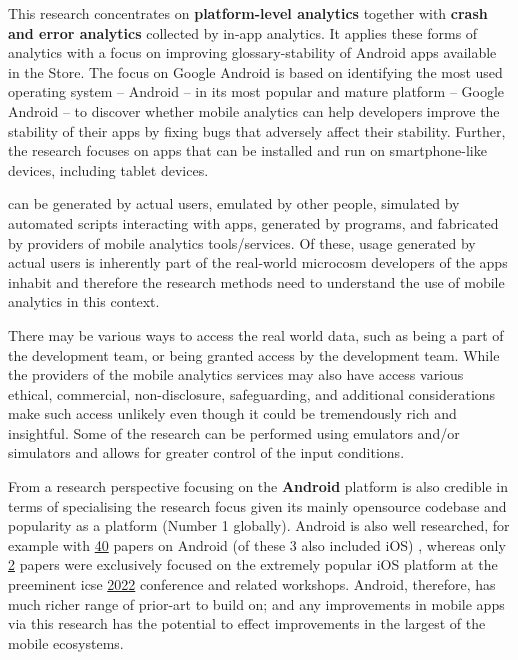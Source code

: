 This research concentrates on \textbf{platform-level analytics} together with \textbf{crash and error analytics} collected by in-app analytics. It applies these forms of analytics with a focus on improving \gls{glossary-stability} of Android apps available in the  Store. The focus on Google Android is based on identifying the most used operating system -- Android -- in its most popular and mature platform -- Google Android -- to discover whether mobile analytics can help developers improve the stability of their apps by fixing bugs that adversely affect their stability. Further, the research focuses on apps that can be installed and run on smartphone-like devices, including tablet devices.

\begin{kaobox}[frametitle=Usage data]
 can be generated by actual users, emulated by other people, simulated by automated scripts interacting with apps, generated by programs, and fabricated by providers of mobile analytics tools/services. Of these, usage generated by actual users is inherently part of the real-world microcosm developers of the apps inhabit and therefore the research methods need to understand the use of mobile analytics in this context. 

There may be various ways to access the real world data, such as being a part of the development team, or being granted access by the development team. While the providers of the mobile analytics services may also have access various ethical, commercial, non-disclosure, safeguarding, and additional considerations make such access unlikely even though it could be tremendously rich and insightful. Some of the research can be performed using emulators and/or simulators and allows for greater control of the input conditions.
\end{kaobox}

From a research perspective focusing on the \textbf{Android} platform is also credible in terms of specialising the research focus given its mainly opensource codebase and popularity as a platform (Number 1 globally). Android is also well researched, for example with 
\href{https://conf.researchr.org/search/icse-2022/android/events}{40} papers on Android (of these 3 also included iOS) %
, whereas only \href{https://conf.researchr.org/search/icse-2022/ios/events}{2} %
papers were exclusively focused on the extremely popular iOS platform at the preeminent \gls{icse} \href{https://conf.researchr.org/home/icse-2022}{2022} conference and related workshops. Android, therefore, has much richer range of prior-art to build on; and any improvements in mobile apps via this research has the potential to effect improvements in the largest of the mobile ecosystems.

